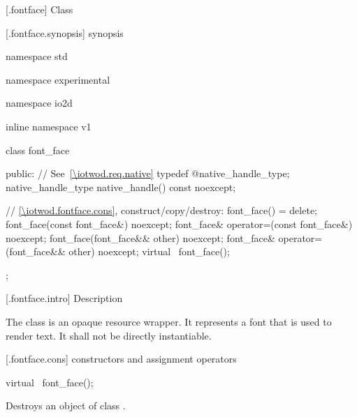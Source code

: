  [\iotwod.fontface] {Class }

 [\iotwod.fontface.synopsis] { synopsis}

\begin{codeblock}
namespace std { namespace experimental { namespace io2d { inline namespace v1 {
  class font_face {
  public:
    // See~\ref{\iotwod.req.native}
    typedef @\impdef@ native_handle_type;
    native_handle_type native_handle() const noexcept;

    // \ref{\iotwod.fontface.cons}, construct/copy/destroy:
    font_face() = delete;
    font_face(const font_face&) noexcept;
    font_face& operator=(const font_face&) noexcept;
    font_face(font_face&& other) noexcept;
    font_face& operator=(font_face&& other) noexcept;
    virtual ~font_face();
  };
} } } }
\end{codeblock}

 [\iotwod.fontface.intro] { Description}

\pnum
{}
The  class is an opaque resource wrapper. It represents a 
font that is used to render text. It shall not be directly instantiable.

 [\iotwod.fontface.cons] { constructors and 
assignment operators}

\begin{itemdecl}
virtual ~font_face();
\end{itemdecl}
\begin{itemdescr}
	\pnum
	\effects
	Destroys an object of class .
	
\end{itemdescr}
